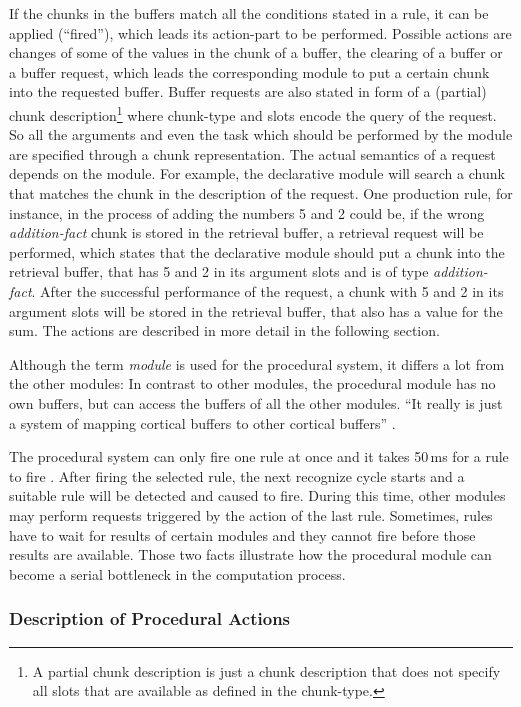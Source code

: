 If the chunks in the buffers match all the conditions stated in a rule, it can be applied (``fired''), which leads its action-part to be performed. Possible actions are changes of some of the values in the chunk of a buffer, the clearing of a buffer or a buffer request, which leads the corresponding module to put a certain chunk into the requested buffer. Buffer requests are also stated in form of a (partial) chunk description\footnote{A partial chunk description is just a chunk description that does not specify all slots that are available as defined in the chunk-type.} where chunk-type and slots encode the query of the request. So all the arguments and even the task which should be performed by the module are specified through a chunk representation. The actual semantics of a request depends on the module. For example, the declarative module will search a chunk that matches the chunk in the description of the request. One production rule, for instance, in the process of adding the numbers 5 and 2 could be, if the wrong \emph{addition-fact} chunk is stored in the retrieval buffer, a retrieval request will be performed, which states that the declarative module should put a chunk into the retrieval buffer, that has 5 and 2 in its argument slots and is of type \emph{addition-fact}. After the successful performance of the request, a chunk with 5 and 2 in its argument slots will be stored in the retrieval buffer, that also has a value for the sum. The actions are described in more detail in the following section.

Although the term \emph{module} is used for the procedural system, it differs a lot from the other modules: In contrast to other modules, the procedural module has no own buffers, but can access the buffers of all the other modules. ``It really is just a system of mapping cortical buffers to other cortical buffers'' \cite[p. 54]{anderson_how_2007}.

The procedural system can only fire one rule at once and it takes 50\,ms for a rule to fire \cite[p. 54]{anderson_how_2007}. After firing the selected rule, the next recognize cycle starts and a suitable rule will be detected and caused to fire. During this time, other modules may perform requests triggered by the action of the last rule. Sometimes, rules have to wait for results of certain modules and they cannot fire before those results are available. Those two facts illustrate how the procedural module can become a serial bottleneck in the computation process.

\subsubsection{Description of Procedural Actions}
\label{description_of_proc_actions}

